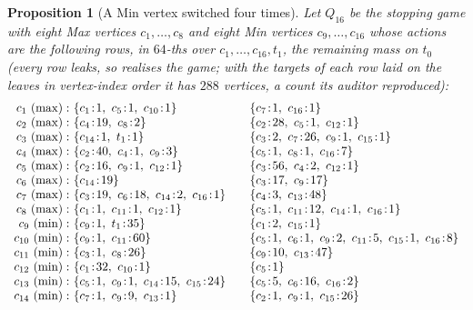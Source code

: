 \documentclass[11pt]{article}
\theoremstyle{plain}
\newtheorem{proposition}[theorem]{Proposition}
\theoremstyle{definition}
\begin{document}
\begin{proposition}[A Min vertex switched four times]\label{prop:q16}
Let $Q_{16}$ be the stopping game with eight Max vertices $c_1,\dots,c_8$
and eight Min vertices $c_9,\dots,c_{16}$ whose actions are the following
rows, in $64$-ths over $c_1,\dots,c_{16},t_1$, the remaining mass on $t_0$
(every row leaks, so  realises the game; with the
targets of each row laid on the leaves in vertex-index order it has $288$
vertices, a count its auditor reproduced):
\[
\begin{array}{r@{\ }l@{\qquad}l}
  c_{1}\ (\max): & \{c_{1}\!:\!1,\ c_{5}\!:\!1,\ c_{10}\!:\!1\} & \{c_{7}\!:\!1,\ c_{16}\!:\!1\}\\
  c_{2}\ (\max): & \{c_{4}\!:\!19,\ c_{8}\!:\!2\} & \{c_{2}\!:\!28,\ c_{5}\!:\!1,\ c_{12}\!:\!1\}\\
  c_{3}\ (\max): & \{c_{14}\!:\!1,\ t_1\!:\!1\} & \{c_{3}\!:\!2,\ c_{7}\!:\!26,\ c_{9}\!:\!1,\ c_{15}\!:\!1\}\\
  c_{4}\ (\max): & \{c_{2}\!:\!40,\ c_{4}\!:\!1,\ c_{9}\!:\!3\} & \{c_{5}\!:\!1,\ c_{8}\!:\!1,\ c_{16}\!:\!7\}\\
  c_{5}\ (\max): & \{c_{2}\!:\!16,\ c_{9}\!:\!1,\ c_{12}\!:\!1\} & \{c_{3}\!:\!56,\ c_{4}\!:\!2,\ c_{12}\!:\!1\}\\
  c_{6}\ (\max): & \{c_{14}\!:\!19\} & \{c_{3}\!:\!17,\ c_{9}\!:\!17\}\\
  c_{7}\ (\max): & \{c_{3}\!:\!19,\ c_{6}\!:\!18,\ c_{14}\!:\!2,\ c_{16}\!:\!1\} & \{c_{4}\!:\!3,\ c_{13}\!:\!48\}\\
  c_{8}\ (\max): & \{c_{1}\!:\!1,\ c_{11}\!:\!1,\ c_{12}\!:\!1\} & \{c_{5}\!:\!1,\ c_{11}\!:\!12,\ c_{14}\!:\!1,\ c_{16}\!:\!1\}\\
  c_{9}\ (\min): & \{c_{9}\!:\!1,\ t_1\!:\!35\} & \{c_{1}\!:\!2,\ c_{15}\!:\!1\}\\
  c_{10}\ (\min): & \{c_{9}\!:\!1,\ c_{11}\!:\!60\} & \{c_{5}\!:\!1,\ c_{6}\!:\!1,\ c_{9}\!:\!2,\ c_{11}\!:\!5,\ c_{15}\!:\!1,\ c_{16}\!:\!8\}\\
  c_{11}\ (\min): & \{c_{3}\!:\!1,\ c_{8}\!:\!26\} & \{c_{9}\!:\!10,\ c_{13}\!:\!47\}\\
  c_{12}\ (\min): & \{c_{1}\!:\!32,\ c_{10}\!:\!1\} & \{c_{5}\!:\!1\}\\
  c_{13}\ (\min): & \{c_{5}\!:\!1,\ c_{9}\!:\!1,\ c_{14}\!:\!15,\ c_{15}\!:\!24\} & \{c_{5}\!:\!5,\ c_{6}\!:\!16,\ c_{16}\!:\!2\}\\
  c_{14}\ (\min): & \{c_{7}\!:\!1,\ c_{9}\!:\!9,\ c_{13}\!:\!1\} & \{c_{2}\!:\!1,\ c_{9}\!:\!1,\ c_{15}\!:\!26\}\\

\end{array}\]
\end{proposition}
\end{document}
